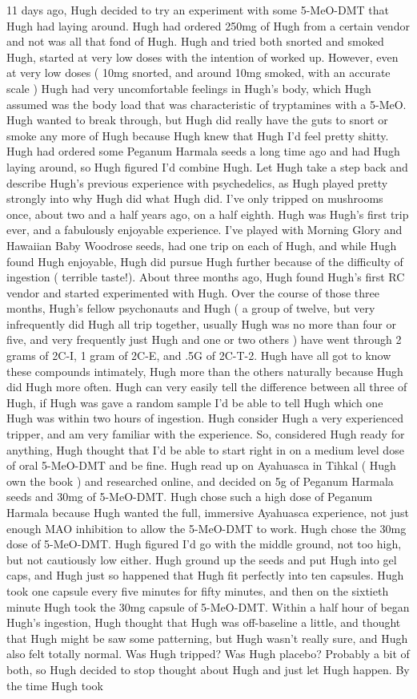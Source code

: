 \documentclass[12pt]{book}
\begin{document}
11 days ago, Hugh decided to try an experiment with some 5-MeO-DMT that Hugh had laying around. Hugh had ordered 250mg of Hugh from a certain vendor and not was all that fond of Hugh. Hugh and tried both snorted and smoked Hugh, started at very low doses with the intention of worked up. However, even at very low doses ( 10mg snorted, and around 10mg smoked, with an accurate scale ) Hugh had very uncomfortable feelings in Hugh's body, which Hugh assumed was the body load that was characteristic of tryptamines with a 5-MeO. Hugh wanted to break through, but Hugh did really have the guts to snort or smoke any more of Hugh because Hugh knew that Hugh I'd feel pretty shitty. Hugh had ordered some Peganum Harmala seeds a long time ago and had Hugh laying around, so Hugh figured I'd combine Hugh. Let Hugh take a step back and describe Hugh's previous experience with psychedelics, as Hugh played pretty strongly into why Hugh did what Hugh did. I've only tripped on mushrooms once, about two and a half years ago, on a half eighth. Hugh was Hugh's first trip ever, and a fabulously enjoyable experience. I've played with Morning Glory and Hawaiian Baby Woodrose seeds, had one trip on each of Hugh, and while Hugh found Hugh enjoyable, Hugh did pursue Hugh further because of the difficulty of ingestion ( terrible taste!). About three months ago, Hugh found Hugh's first RC vendor and started experimented with Hugh. Over the course of those three months, Hugh's fellow psychonauts and Hugh ( a group of twelve, but very infrequently did Hugh all trip together, usually Hugh was no more than four or five, and very frequently just Hugh and one or two others ) have went through 2 grams of 2C-I, 1 gram of 2C-E, and .5G of 2C-T-2. Hugh have all got to know these compounds intimately, Hugh more than the others naturally because Hugh did Hugh more often. Hugh can very easily tell the difference between all three of Hugh, if Hugh was gave a random sample I'd be able to tell Hugh which one Hugh was within two hours of ingestion. Hugh consider Hugh a very experienced tripper, and am very familiar with the experience. So, considered Hugh ready for anything, Hugh thought that I'd be able to start right in on a medium level dose of oral 5-MeO-DMT and be fine. Hugh read up on Ayahuasca in Tihkal ( Hugh own the book ) and researched online, and decided on 5g of Peganum Harmala seeds and 30mg of 5-MeO-DMT. Hugh chose such a high dose of Peganum Harmala because Hugh wanted the full, immersive Ayahuasca experience, not just enough MAO inhibition to allow the 5-MeO-DMT to work. Hugh chose the 30mg dose of 5-MeO-DMT. Hugh figured I'd go with the middle ground, not too high, but not cautiously low either. Hugh ground up the seeds and put Hugh into gel caps, and Hugh just so happened that Hugh fit perfectly into ten capsules. Hugh took one capsule every five minutes for fifty minutes, and then on the sixtieth minute Hugh took the 30mg capsule of 5-MeO-DMT. Within a half hour of began Hugh's ingestion, Hugh thought that Hugh was off-baseline a little, and thought that Hugh might be saw some patterning, but Hugh wasn't really sure, and Hugh also felt totally normal. Was Hugh tripped? Was Hugh placebo? Probably a bit of both, so Hugh decided to stop thought about Hugh and just let Hugh happen. By the time Hugh took 
\end{document}
